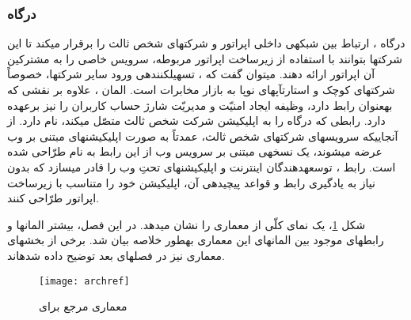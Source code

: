 \subsubsection{درگاه }
\label{osapart}

درگاه ، ارتباط بین شبکه\nf ی داخلی اپراتور و شرکت\nf های شخص ثالث را برقرار می\nf کند تا این شرکت\nf ها بتوانند با استفاده از زیرساخت اپراتور مربوطه، سرویس خاصی را به مشترکین آن اپراتور ارائه دهند. می\nf توان گفت که ، تسهیل\nf کننده\nf ی ورود سایر شرکت\nf ها، خصوصاً شرکت\nf های کوچک و استارت\nf آپ\nf های نوپا به بازار مخابرات است. المان ، علاوه بر نقشی که به\nf عنوان رابط دارد، وظیفه ایجاد امنیّت و مدیریّت شارژ حساب کاربران را نیز  برعهده دارد. رابطی که درگاه  را به اپلیکیشن شرکت شخص ثالث متصّل می\nf کند،  نام دارد. از آنجایی\nf که سرویس\nf های شرکت\nf های شخص ثالث، عمدتاً به صورت اپلیکیشن\nf های مبتنی بر وب عرضه می\nf شوند، یک نسخه\nf ی مبتنی بر سرویس وب از  این رابط به نام  طرّاحی شده است. رابط ، توسعه\nf دهندگان اینترنت و اپلیکیشن\nf های تحتِ وب  را قادر می\nf سازد که بدون نیاز به یادگیری رابط  و قواعد پیچیده\nf ی آن، اپلیکیشن خود را متناسب با زیرساخت اپراتور طرّاحی کنند. 


شکل \ref{archref}، یک نمای کلّی از معماری  را نشان می\nf دهد. در این فصل، بیشتر المان\nf ها و رابط\nf های موجود بین المان\nf های این معماری به\nf طور خلاصه بیان شد. برخی از بخش\nf های معماری  نیز در فصل\nf های بعد توضیح داده شده\nf اند.
\begin{figure}[h]
\centering
\texttt{[image: archref]}
\caption{معماری مرجع برای }
\label{archref}
\end{figure}

